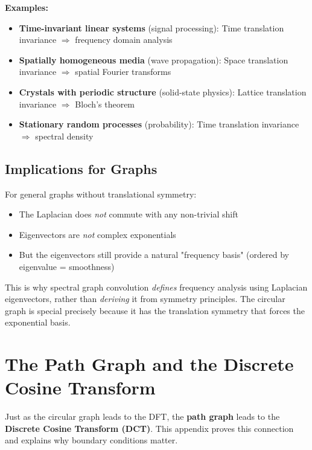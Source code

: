 \begin{notechapter}
\textbf{Examples:}
\begin{itemize}
\item \textbf{Time-invariant linear systems} (signal processing): 
      Time translation invariance $\Rightarrow$ frequency domain analysis
\item \textbf{Spatially homogeneous media} (wave propagation): 
      Space translation invariance $\Rightarrow$ spatial Fourier transforms
\item \textbf{Crystals with periodic structure} (solid-state physics): 
      Lattice translation invariance $\Rightarrow$ Bloch's theorem
\item \textbf{Stationary random processes} (probability): 
      Time translation invariance $\Rightarrow$ spectral density
\end{itemize}

\subsection{Implications for Graphs}

For general graphs without translational symmetry:
\begin{itemize}
\item The Laplacian does \emph{not} commute with any non-trivial shift
\item Eigenvectors are \emph{not} complex exponentials
\item But the eigenvectors still provide a natural "frequency basis" 
      (ordered by eigenvalue = smoothness)
\end{itemize}

This is why spectral graph convolution \emph{defines} frequency analysis 
using Laplacian eigenvectors, rather than \emph{deriving} it from 
symmetry principles. The circular graph is special precisely because 
it has the translation symmetry that forces the exponential basis.

\newpage
\section{The Path Graph and the Discrete Cosine Transform}
\label{dft-to-gnn:app:dct-path}

Just as the circular graph leads to the DFT, the \textbf{path graph} 
leads to the \textbf{Discrete Cosine Transform (DCT)}. This appendix 
proves this connection and explains why boundary conditions matter.


\end{notechapter}
